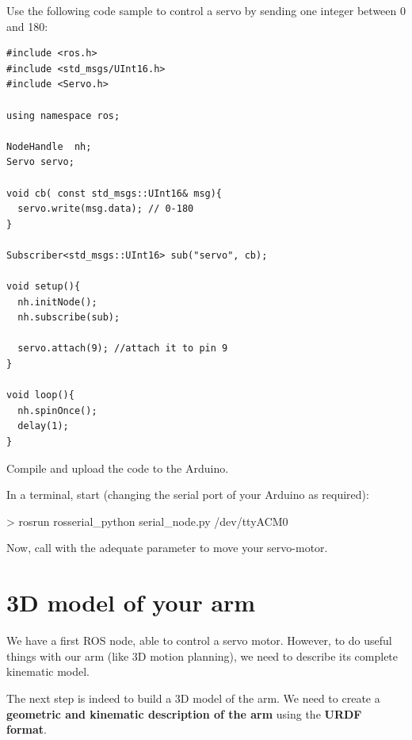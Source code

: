 \documentclass{instructions}
\begin{document}


Use the following code sample to control a servo by sending one integer between
0 and 180:

\begin{verbatim}
#include <ros.h>
#include <std_msgs/UInt16.h>
#include <Servo.h> 

using namespace ros;

NodeHandle  nh;
Servo servo;

void cb( const std_msgs::UInt16& msg){
  servo.write(msg.data); // 0-180
}

Subscriber<std_msgs::UInt16> sub("servo", cb);

void setup(){
  nh.initNode();
  nh.subscribe(sub);

  servo.attach(9); //attach it to pin 9
}

void loop(){
  nh.spinOnce();
  delay(1);
}

\end{verbatim}


Compile and upload the code to the Arduino.

In a terminal, start  (changing the serial port of your Arduino as
required):

\begin{shcode}
> rosrun rosserial_python serial_node.py /dev/ttyACM0
\end{shcode}

Now, call  with the adequate parameter to move your servo-motor.

\part{3D model of your arm}

We have a first ROS node, able to control a servo motor. However, to do useful
things with our arm (like 3D motion planning), we need to describe its complete
kinematic model.

The next step is indeed to build a 3D model of the arm. We need to create a
\textbf{geometric and kinematic description of the arm} using the \textbf{URDF
format}.

\end{document}
